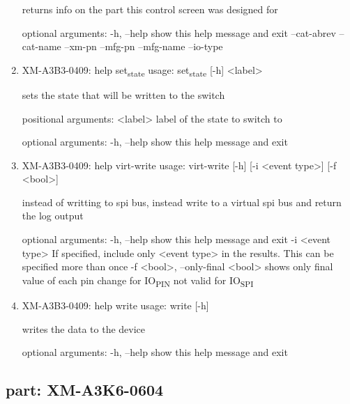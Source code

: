 \documentclass[11pt]{article}
\begin{document}
\begin{enumerate}
returns info on the part this control screen was designed for

optional arguments:
  -h, --help   show this help message and exit
  --cat-abrev
  --cat-name
  --xm-pn
  --mfg-pn
  --mfg-name
  --io-type

\item XM-A3B3-0409: help set\textsubscript{state}
\label{sec:org590393d}
usage: set\textsubscript{state} [-h] <label>

sets the state that will be written to the switch

positional arguments:
  <label>     label of the state to switch to

optional arguments:
  -h, --help  show this help message and exit

\item XM-A3B3-0409: help virt-write
\label{sec:org65b0665}
usage: virt-write [-h] [-i <event type>] [-f <bool>]

instead of writting to spi bus, instead write to a virtual spi bus and return
the log output

optional arguments:
  -h, --help            show this help message and exit
  -i <event type>       If specified, include only <event type> in the
                        results. This can be specified more than once
  -f <bool>, --only-final <bool>
                        shows only final value of each pin change for IO\textsubscript{PIN}
                        not valid for IO\textsubscript{SPI}

\item XM-A3B3-0409: help write
\label{sec:org6590e13}
usage: write [-h]

writes the data to the device

optional arguments:
  -h, --help  show this help message and exit
\end{enumerate}

\subsection{part: XM-A3K6-0604}
\label{sec:orgd37d31a}
\end{document}
